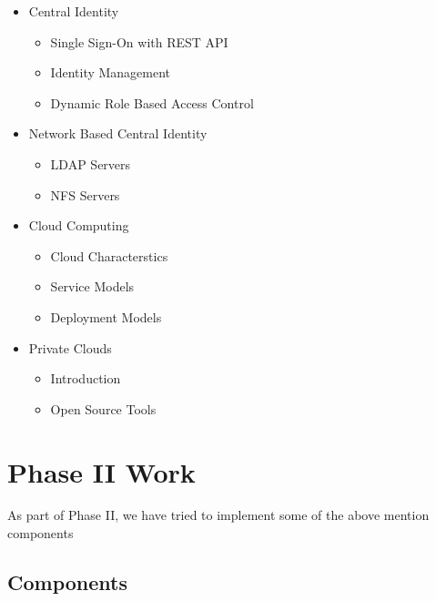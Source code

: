 \documentclass[12pt]{report}
\begin{document}
	\begin{itemize}
		\item Central Identity
		\begin{itemize}
			\item Single Sign-On with REST API
			\item Identity Management
			\item Dynamic Role Based Access Control
		\end{itemize}
		\item Network Based Central Identity
		\begin{itemize}
			\item LDAP Servers
			\item NFS Servers
		\end{itemize}
		\item Cloud Computing
		\begin{itemize}
			\item 	Cloud Characterstics
			\item Service Models 
			\item Deployment Models 
		\end{itemize}		 
		\item Private Clouds 
		\begin{itemize}
		 	\item Introduction 
			\item Open Source Tools 
		\end{itemize}			

	\end{itemize}

\chapter{Phase II Work}

	As part of Phase II, we have tried to implement some of the above mention components 

\section{Components}
\end{document}
